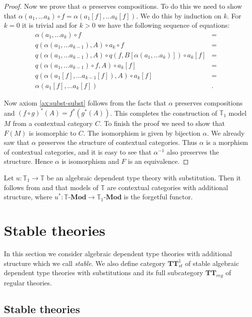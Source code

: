 \documentclass[reqno]{amsart}
\theoremstyle{definition}
\theoremstyle{remark}
\newcommand{\cat}[1]{\mathbf{#1}}
\newcommand{\algtt}{\cat{TT}}
\newcommand{\Mod}[1]{#1\text{-}\cat{Mod}}
\numberwithin{figure}{section}
\begin{document}
\begin{proof}
Now we prove that $\alpha$ preserves compositions.
To do this we need to show that $\alpha(a_1, \ldots a_k) \circ f = \alpha(a_1[f], \ldots a_k[f])$.
We do this by induction on $k$.
For $k = 0$ it is trivial and for $k > 0$ we have the following sequence of equations:
\begin{align*}
\alpha(a_1, \ldots a_k) \circ f & = \\
q(\alpha(a_1, \ldots a_{k-1}), A) \circ a_k \circ f & = \\
q(\alpha(a_1, \ldots a_{k-1}), A) \circ q(f, B[\alpha(a_1, \ldots a_k)]) \circ a_k[f] & = \\
q(\alpha(a_1, \ldots a_{k-1}) \circ f, A) \circ a_k[f] & = \\
q(\alpha(a_1[f], \ldots a_{k-1}[f]), A) \circ a_k[f] & = \\
\alpha(a_1[f], \ldots a_k[f]) & .
\end{align*}

Now axiom \eqref{ax:subst-subst} follows from the facts that $\alpha$ preserves compositions and $(f \circ g)^*(A) = f^*(g^*(A))$.
This completes the construction of $\mathbb{T}_1$ model $M$ from a contextual category $C$.
To finish the proof we need to show that $F(M)$ is isomorphic to $C$.
The isomorphism is given by bijection $\alpha$.
We already saw that $\alpha$ preserves the structure of contextual categories.
Thus $\alpha$ is a morphism of contextual categories, and it is easy to see that $\alpha^{-1}$ also preserves the structure.
Hence $\alpha$ is isomorphism and $F$ is an equivalence.
\end{proof}

Let $u : \mathbb{T}_1 \to \mathbb{T}$ be an algebraic dependent type theory with substitution.
Then it follows from  and  that models of $\mathbb{T}$ are contextual categories with additional structure,
    where $u^* : \Mod{\mathbb{T}} \to \Mod{\mathbb{T}_1}$ is the forgetful functor.

\section{Stable theories}

In this section we consider algebraic dependent type theories with additional structure which we call \emph{stable}.
We also define category $\algtt^1_{st}$ of stable algebraic dependent type theories with substitutions and its full subcategory $\algtt_{reg}$ of regular theories.

\subsection{Stable theories}
\end{document}
